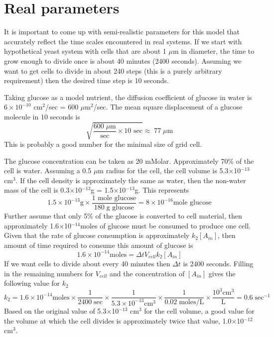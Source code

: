\documentclass[12pt]{article}
\begin{document}
\section{Real parameters}
It is important to come up with semi-realistic parameters for this model that
accurately reflect the time scales encountered in real systems. If we start with
hypothetical yeast system with cells that are about 1 $\mu$m in diameter, the time
to grow enough to divide once is about 40 minutes (2400 seconds). Assuming we want
to get cells to divide in about 240 steps (this is a purely arbitrary requirement)
then the desired time step is 10 seconds.

Taking glucose as
a model nutrient, the diffusion coefficient of glucose in water is $6\times 10^{-10}$
cm$^2$/sec = 600 $\mu$m$^2$/sec. The mean square displacement of a glucose molecule
in 10 seconds is
\[
\sqrt{ \frac{600\;\mu\mathrm{m}}{\mbox{sec}}\times \mbox{10 sec}}
\approx\;77\;\mu\mathrm{m}
\]
This is probably a good number for the minimal size of grid cell.

The glucose concentration can be taken as 20 mMolar. Approximately 70\% of the cell is
water. Assuming a 0.5 $\mu$m radius for the cell, the cell volume is 5.3$\times$10$^{-13}$
cm$^3$. If the cell density is approximately the same as water, then the non-water mass of
the cell is 0.3$\times$10$^{-13}$g = 1.5$\times$10$^{-13}$g. This represents
\[
1.5\times 10^{-13}\mbox{g}\times\frac{\mbox{1 mole glucose}}{180\;\mbox{g glucose}} = 8\times 10^{-16}
\mbox{mole glucose}
\]
Further assume that only 5\% of the glucose is converted to cell material, then approximately
1.6$\times$10$^{-14}$moles of glucose must be consumed to produce one cell. Given that the rate of
glucose consumption is approximately $k_2 [A_{in}]$, then amount of time required to consume this
amount of glucose is
\[
1.6\times 10^{-14}\mbox{moles} = \Delta t V_{cell}k_2 [A_{in}]
\]
If we want cells to divide about every 40 minutes then $\Delta t$ is 2400 seconds. Filling in the
remaining numbers for $V_{cell}$ and the concentration of $[A_{in}]$ gives the following value for $k_2$
\[
k_2 = 1.6\times 10^{-14}\mbox{moles}\times\frac{1}{2400\;\mbox{sec}}
\times\frac{1}{5.3\times 10^{-13}\mbox{cm}^3}
\times\frac{1}{0.02\;\mbox{moles/L}}\times\frac{10^3\mbox{cm}^3}{\mbox{L}}= 0.6\;\mbox{sec}^{-1}
\]
Based on the original value of 5.3$\times$10$^{-13}$ cm$^3$ for the cell volume, a good value for the volume
at which the cell divides is approximately twice that value, 1.0$\times$10$^{-12}$ cm$^3$.
\end{document}
